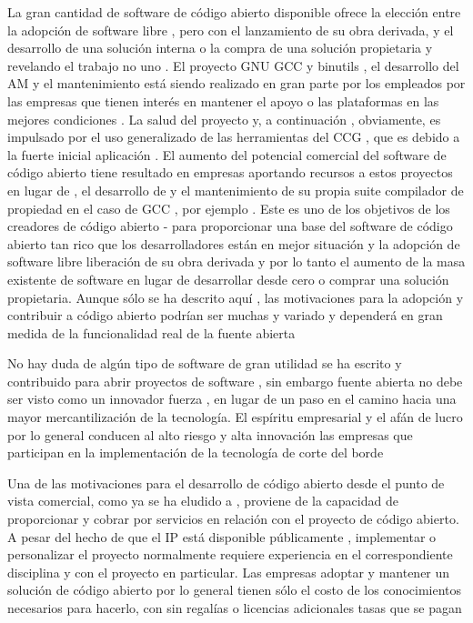 \documentclass[a4paper,11pt]{article}
\begin{document}
La gran cantidad de software de código abierto disponible ofrece la elección entre
la adopción de software libre , pero con el lanzamiento de su obra derivada, y el desarrollo de una solución interna o la compra de una solución propietaria y revelando el trabajo no uno . El proyecto GNU GCC y binutils , el desarrollo del AM y el mantenimiento está siendo realizado en gran parte por los empleados por las empresas que tienen interés en mantener el apoyo o las plataformas en las mejores condiciones . La salud del proyecto y, a continuación , obviamente,
es impulsado por el uso generalizado de las herramientas del CCG , que es debido a la fuerte inicial aplicación . El aumento del potencial comercial del software de código abierto tiene resultado en empresas aportando recursos a estos proyectos en lugar de , el desarrollo de y el mantenimiento de su propia suite compilador de propiedad en el caso de GCC , por ejemplo . Este es uno de los objetivos de los creadores de código abierto - para proporcionar una base del software de código abierto tan rico que los desarrolladores están en mejor situación y la adopción de software libre liberación de su obra derivada y por lo tanto el aumento de la masa existente de software en lugar de desarrollar desde cero o comprar una solución propietaria.
Aunque sólo se ha descrito aquí , las motivaciones para la adopción y contribuir a código abierto podrían ser muchas y variado y dependerá en gran medida de la funcionalidad real de la fuente abierta 

No hay duda de algún tipo de software de gran utilidad se ha escrito y contribuido
para abrir proyectos de software , sin embargo fuente abierta no debe ser visto como un innovador
fuerza , en lugar de un paso en el camino hacia una mayor mercantilización de la tecnología.
El espíritu empresarial y el afán de lucro por lo general conducen al alto riesgo y alta innovación
las empresas que participan en la implementación de la tecnología de corte del borde 

Una de las motivaciones para el desarrollo de código abierto desde el punto de vista comercial,
como ya se ha eludido a , proviene de la capacidad de proporcionar y cobrar por servicios
en relación con el proyecto de código abierto. A pesar del hecho de que el IP está disponible públicamente ,
implementar o personalizar el proyecto normalmente requiere experiencia en el correspondiente
disciplina y con el proyecto en particular. Las empresas adoptar y mantener un
solución de código abierto por lo general tienen sólo el costo de los conocimientos necesarios para hacerlo, con
sin regalías o licencias adicionales tasas que se pagan
\end{document}
